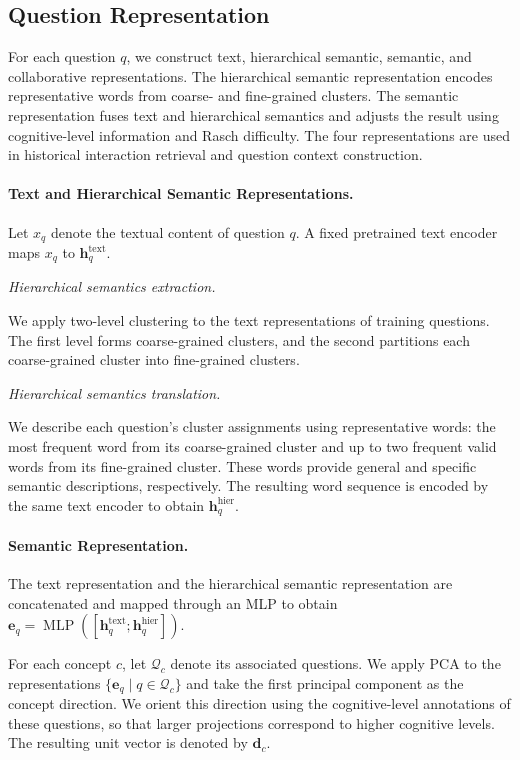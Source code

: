 \documentclass{llncs}
\begin{document}
\subsection{Question Representation}

For each question \(q\), we construct text, hierarchical semantic, semantic, and collaborative representations. The hierarchical semantic representation encodes representative words from coarse- and fine-grained clusters. The semantic representation fuses text and hierarchical semantics and adjusts the result using cognitive-level information and Rasch difficulty. The four representations are used in historical interaction retrieval and question context construction.

\paragraph{Text and Hierarchical Semantic Representations.}

Let \(x_q\) denote the textual content of question \(q\). A fixed pretrained text encoder maps \(x_q\) to \(\mathbf{h}_q^{\mathrm{text}}\).

\textit{Hierarchical semantics extraction.}

We apply two-level clustering to the text representations of training questions. The first level forms coarse-grained clusters, and the second partitions each coarse-grained cluster into fine-grained clusters.

\textit{Hierarchical semantics translation.}

We describe each question's cluster assignments using representative words: the most frequent word from its coarse-grained cluster and up to two frequent valid words from its fine-grained cluster. These words provide general and specific semantic descriptions, respectively. The resulting word sequence is encoded by the same text encoder to obtain $\mathbf h_q^{\mathrm{hier}}$.

\paragraph{Semantic Representation.}

The text representation and the hierarchical semantic representation are concatenated and mapped through an MLP to obtain \(\mathbf{e}_q= \operatorname{MLP}( [\mathbf{h}_q^{\mathrm{text}}; \mathbf{h}_q^{\mathrm{hier}}])\).

For each concept \(c\), let \(\mathcal{Q}_c\) denote its associated questions. We apply PCA to the representations \(\{\mathbf{e}_q\mid q\in\mathcal{Q}_c\}\) and take the first principal component as the concept direction. We orient this direction using the cognitive-level annotations of these questions, so that larger projections correspond to higher cognitive levels. The resulting unit vector is denoted by \(\mathbf{d}_c\).
\end{document}
